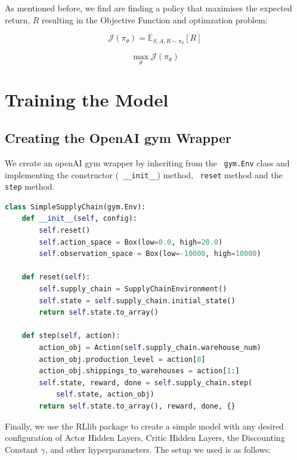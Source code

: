 \documentclass{article}
\begin{document}
As mentioned before, we find are finding a policy that maximises the expected return, \(R\) resulting in the Objective Function and optimzation problem:

\begin{equation}
    \mathcal{J}(\pi_{\theta}) = \mathbb{E}_{S, A, R \sim \pi_{\theta}} \left[ R \right] \end{equation}

\begin{equation}
    \max_{\theta}\mathcal{J}(\pi_{\theta})
\end{equation}





\pagebreak

\section{Training the Model}
\subsection{Creating the OpenAI gym Wrapper}

We create an openAI gym wrapper by inheriting from the \lstinline{ gym.Env} class and implementing the constructor (\lstinline{ __init__}) method, \lstinline{ reset} method and the \lstinline{ step} method.

\begin{lstlisting}[language=Python]
class SimpleSupplyChain(gym.Env):
    def __init__(self, config):
        self.reset()
        self.action_space = Box(low=0.0, high=20.0)
        self.observation_space = Box(low=-10000, high=10000)

    def reset(self):
        self.supply_chain = SupplyChainEnvironment()
        self.state = self.supply_chain.initial_state()
        return self.state.to_array()

    def step(self, action):
        action_obj = Action(self.supply_chain.warehouse_num)
        action_obj.production_level = action[0]
        action_obj.shippings_to_warehouses = action[1:]
        self.state, reward, done = self.supply_chain.step(
            self.state, action_obj)
        return self.state.to_array(), reward, done, {}
\end{lstlisting}

Finally, we use the RLlib package to create a simple model with any desired configuration of Actor Hidden Layers, Critic Hidden Layers, the Discounting Constant \( \gamma \), and other hyperparameters. The setup we used is as follows:
\end{document}
